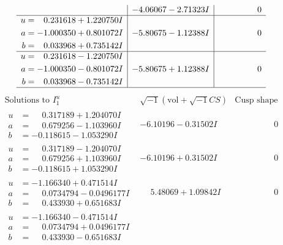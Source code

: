 \documentclass[1p]{elsarticle_modified}
\theoremstyle{definition}
\newcommand{\I}{\sqrt{-1}}
\begin{document}
$$\begin{array}{c|c|c}
 & -4.06067 - 2.71323 I & \phantom{-0.000000 } 0 \\ \hline\begin{aligned}
u &= \phantom{-}0.231618 + 1.220750 I \\
a &= -1.000350 + 0.801072 I \\
b &= \phantom{-}0.033968 + 0.735142 I\end{aligned}
 & -5.80675 - 1.12388 I & \phantom{-0.000000 } 0 \\ \hline\begin{aligned}
u &= \phantom{-}0.231618 - 1.220750 I \\
a &= -1.000350 - 0.801072 I \\
b &= \phantom{-}0.033968 - 0.735142 I\end{aligned}
 & -5.80675 + 1.12388 I & \phantom{-0.000000 } 0\\
 \hline 
 \end{array}$$\newpage$$\begin{array}{c|c|c}  
\text{Solutions to }I^u_{1}& \I (\text{vol} + \sqrt{-1}CS) & \text{Cusp shape}\\
 \hline 
\begin{aligned}
u &= \phantom{-}0.317189 + 1.204070 I \\
a &= \phantom{-}0.679256 - 1.103960 I \\
b &= -0.118615 - 1.053290 I\end{aligned}
 & -6.10196 - 0.31502 I & \phantom{-0.000000 } 0 \\ \hline\begin{aligned}
u &= \phantom{-}0.317189 - 1.204070 I \\
a &= \phantom{-}0.679256 + 1.103960 I \\
b &= -0.118615 + 1.053290 I\end{aligned}
 & -6.10196 + 0.31502 I & \phantom{-0.000000 } 0 \\ \hline\begin{aligned}
u &= -1.166340 + 0.471514 I \\
a &= \phantom{-}0.0734794 - 0.0496177 I \\
b &= \phantom{-}0.433930 + 0.651683 I\end{aligned}
 & \phantom{-}5.48069 + 1.09842 I & \phantom{-0.000000 } 0 \\ \hline\begin{aligned}
u &= -1.166340 - 0.471514 I \\
a &= \phantom{-}0.0734794 + 0.0496177 I \\
b &= \phantom{-}0.433930 - 0.651683 I\end{aligned}

\end{array}$$
\end{document}
